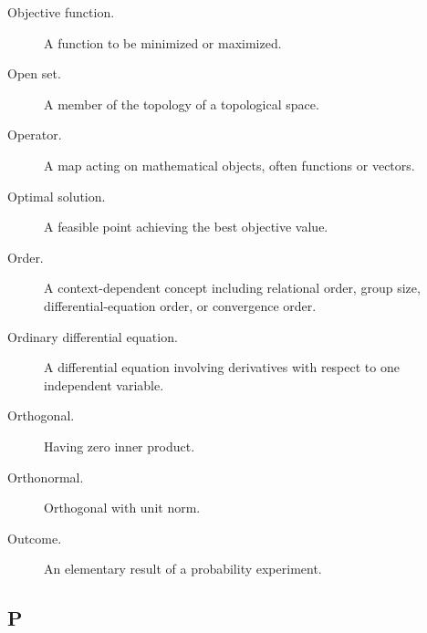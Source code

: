 \begin{description}

\item[Objective function.]
A function to be minimized or maximized.

\item[Open set.]
A member of the topology of a topological space.

\item[Operator.]
A map acting on mathematical objects, often functions or vectors.

\item[Optimal solution.]
A feasible point achieving the best objective value.

\item[Order.]
A context-dependent concept including relational order, group size,
differential-equation order, or convergence order.

\item[Ordinary differential equation.]
A differential equation involving derivatives with respect to one independent
variable.

\item[Orthogonal.]
Having zero inner product.

\item[Orthonormal.]
Orthogonal with unit norm.

\item[Outcome.]
An elementary result of a probability experiment.

\end{description}

\subsection*{P}


